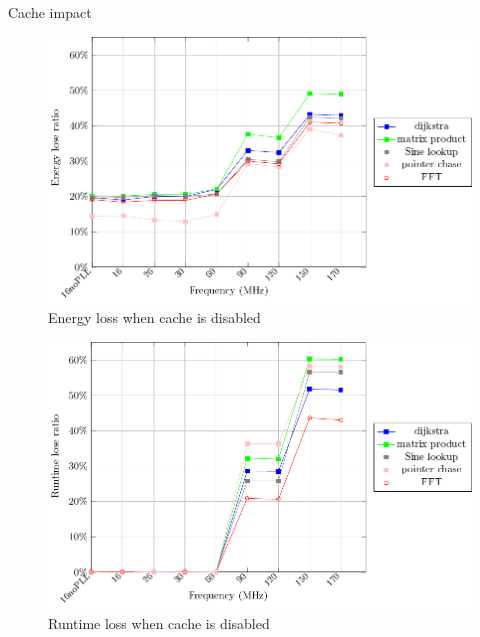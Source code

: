\documentclass[
	11pt, %
]{beamer}
\begin{document}
\begin{frame}{Cache impact}
	\begin{minipage}{0.4\textwidth}
		\begin{figure}
			\includegraphics[scale = 0.3]{data/stm32g_v2/cache_impact/energy.pdf}
			\caption{Energy loss when cache is disabled}
		\end{figure}
		\vspace*{-0.9cm}
		\begin{figure}
			\includegraphics[scale = 0.3]{data/stm32g_v2/cache_impact/duration.pdf}
			\caption{Runtime loss when cache is disabled}
		\end{figure}
	\end{minipage}
	\begin{minipage}{0.08\textwidth}
		$ $
	\end{minipage}
	\begin{minipage}{0.5\textwidth}
		\vspace*{-0.5cm}
		\begin{figure}

\end{figure}
\end{minipage}
\end{frame}
\end{document}
